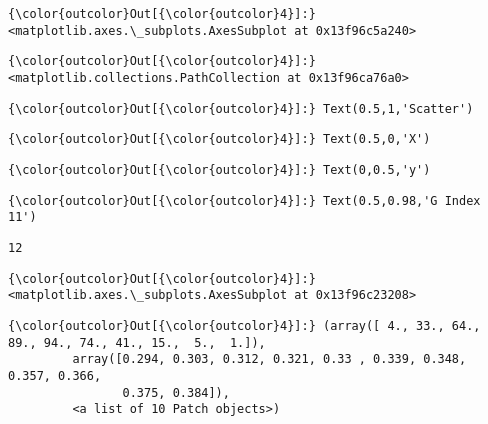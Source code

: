 \documentclass[11pt]{article}
\begin{document}
\begin{Verbatim}[commandchars=\\\{\}]
{\color{outcolor}Out[{\color{outcolor}4}]:} <matplotlib.axes.\_subplots.AxesSubplot at 0x13f96c5a240>
\end{Verbatim}
            
\begin{Verbatim}[commandchars=\\\{\}]
{\color{outcolor}Out[{\color{outcolor}4}]:} <matplotlib.collections.PathCollection at 0x13f96ca76a0>
\end{Verbatim}
            
\begin{Verbatim}[commandchars=\\\{\}]
{\color{outcolor}Out[{\color{outcolor}4}]:} Text(0.5,1,'Scatter')
\end{Verbatim}
            
\begin{Verbatim}[commandchars=\\\{\}]
{\color{outcolor}Out[{\color{outcolor}4}]:} Text(0.5,0,'X')
\end{Verbatim}
            
\begin{Verbatim}[commandchars=\\\{\}]
{\color{outcolor}Out[{\color{outcolor}4}]:} Text(0,0.5,'y')
\end{Verbatim}
            
\begin{Verbatim}[commandchars=\\\{\}]
{\color{outcolor}Out[{\color{outcolor}4}]:} Text(0.5,0.98,'G Index 11')
\end{Verbatim}
            
    \begin{Verbatim}[commandchars=\\\{\}]
12

    \end{Verbatim}

\begin{Verbatim}[commandchars=\\\{\}]
{\color{outcolor}Out[{\color{outcolor}4}]:} <matplotlib.axes.\_subplots.AxesSubplot at 0x13f96c23208>
\end{Verbatim}
            
\begin{Verbatim}[commandchars=\\\{\}]
{\color{outcolor}Out[{\color{outcolor}4}]:} (array([ 4., 33., 64., 89., 94., 74., 41., 15.,  5.,  1.]),
         array([0.294, 0.303, 0.312, 0.321, 0.33 , 0.339, 0.348, 0.357, 0.366,
                0.375, 0.384]),
         <a list of 10 Patch objects>)
\end{Verbatim}
            
\end{document}

